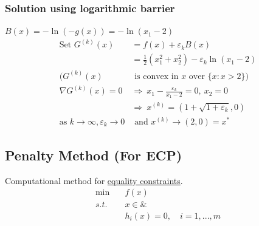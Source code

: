 \documentclass[11pt,a4paper]{article}
\begin{document}
\subsubsection{Solution using logarithmic barrier}
$B(x)=-\ln(-g(x))=-\ln(x_1-2)$
\begin{equation}
    \begin{aligned}
        \text{Set }G^{(k)}(x)&=f(x)+\varepsilon_kB(x)\\
        &=\frac{1}{2}(x_1^2+x_2^2)-\varepsilon_k\ln(x_1-2)\\
        (G^{(k)}(x)&\text{ is convex in $x$ over }\{x:x>2\})\\
        \nabla G^{(k)}(x)=0 &\Rightarrow\ x_1-\frac{\varepsilon_k}{x_1-2}=0,\ x_2=0\\
        &\Rightarrow\ x^{(k)}=(1+\sqrt{1+\varepsilon_k},0)\\
        \text{as }k \rightarrow	\infty,\varepsilon_k \rightarrow 0&\text{ and }x^{(k)} \rightarrow (2,0)=x^*
    \end{aligned}
    \nonumber
\end{equation}

\subsection{Penalty Method (For ECP)}
Computational method for \underline{equality constraints}.
\begin{equation}
    \begin{aligned}
        \min\quad &f(x)\\
        s.t.\ &x\in \&\\
        &h_i(x)=0,\quad i=1,...,m
    \end{aligned}
    \nonumber
\end{equation}
\end{document}
